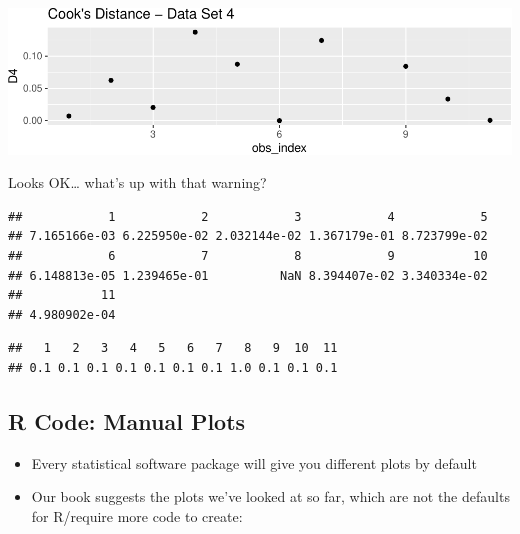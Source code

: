 \documentclass[]{extarticle}
\newenvironment{Shaded}{\begin{snugshade}}{\end{snugshade}}
\newcommand{\OperatorTok}[1]{\textcolor[rgb]{0.81,0.36,0.00}{\textbf{#1}}}
\newcommand{\NormalTok}[1]{#1}
\providecommand{\tightlist}{%
  \setlength{\itemsep}{0pt}\setlength{\parskip}{0pt}}
\begin{document}
\includegraphics{20190417_residual_diagnostics_files/figure-latex/unnamed-chunk-12-1.pdf}

Looks OK\ldots{} what's up with that warning?

\begin{Shaded}
\end{Shaded}

\begin{verbatim}
##            1            2            3            4            5 
## 7.165166e-03 6.225950e-02 2.032144e-02 1.367179e-01 8.723799e-02 
##            6            7            8            9           10 
## 6.148813e-05 1.239465e-01          NaN 8.394407e-02 3.340334e-02 
##           11 
## 4.980902e-04
\end{verbatim}

\begin{Shaded}
\end{Shaded}

\begin{verbatim}
##   1   2   3   4   5   6   7   8   9  10  11 
## 0.1 0.1 0.1 0.1 0.1 0.1 0.1 1.0 0.1 0.1 0.1
\end{verbatim}

\newpage

\subsection{R Code: Manual Plots}\label{r-code-manual-plots}

\begin{itemize}
\tightlist
\item
  Every statistical software package will give you different plots by
  default
\item
  Our book suggests the plots we've looked at so far, which are not the
  defaults for R/require more code to create:
\end{itemize}
\end{document}
